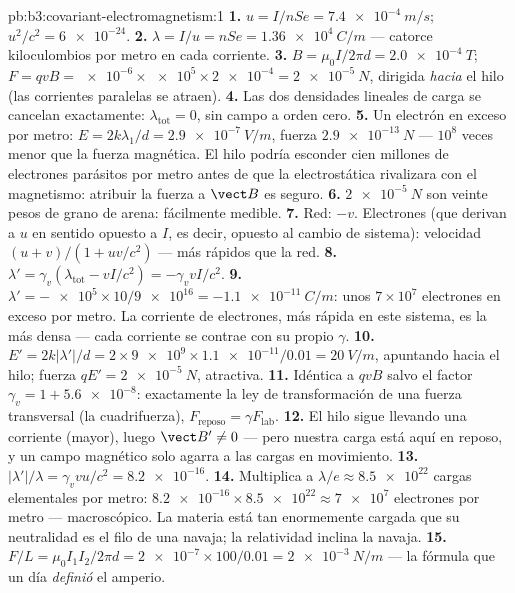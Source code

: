 \begin{solution}{pb:b3:covariant-electromagnetism:1}
\textbf{1.} $u = I/nSe = \qty{7.4e-4}{m/s}$; $u^2/c^2 =
\num{6e-24}$.
\textbf{2.} $\lambda = I/u = nSe = \qty{1.36e4}{C/m}$ --- catorce
kiloculombios por metro en cada corriente.
\textbf{3.} $B = \mu_0I/2\pi d = \qty{2.0e-4}{T}$; $F = qvB =
\num{e-6} \times \num{e5} \times \num{2e-4} = \qty{2e-5}{N}$,
dirigida \emph{hacia} el hilo (las corrientes paralelas se atraen).
\textbf{4.} Las dos densidades lineales de carga se cancelan exactamente: $\lambda_{\text{tot}}
= 0$, sin campo a orden cero.
\textbf{5.} Un electrón en exceso por metro: $E = 2k\lambda_1/d =
\qty{2.9e-7}{V/m}$, fuerza $\qty{2.9e-13}{N}$ --- $10^8$ veces menor
que la fuerza magnética. El hilo podría esconder cien millones de
electrones parásitos por metro antes de que la electrostática rivalizara con
el magnetismo: atribuir la fuerza a $\vect B$ es seguro.
\textbf{6.} $\qty{2e-5}{N}$ son veinte pesos de grano de arena: fácilmente
medible.
\textbf{7.} Red: $-v$. Electrones (que derivan a $u$ en sentido opuesto a
$I$, es decir, opuesto al cambio de sistema): velocidad
$(u + v)/(1 + uv/c^2)$ --- más rápidos que la red.
\textbf{8.} $\lambda' = \gamma_v(\lambda_{\text{tot}} - vI/c^2) =
-\gamma_v vI/c^2$.
\textbf{9.} $\lambda' = -\num{e5} \times 10/\num{9e16} =
\qty{-1.1e-11}{C/m}$: unos $7 \times 10^7$ electrones en exceso por
metro. La corriente de electrones, más rápida en este sistema, es la más
densa --- cada corriente se contrae con su propio $\gamma$.
\textbf{10.} $E' = 2k|\lambda'|/d = 2 \times \num{9e9} \times
\num{1.1e-11}/0.01 = \qty{20}{V/m}$, apuntando hacia el hilo; fuerza
$qE' = \qty{2e-5}{N}$, atractiva.
\textbf{11.} Idéntica a $qvB$ salvo el factor $\gamma_v = 1 +
\num{5.6e-8}$: exactamente la ley de transformación de una fuerza
transversal (la cuadrifuerza), $F_{\text{reposo}} = \gamma F_{\text{lab}}$.
\textbf{12.} El hilo sigue llevando una corriente (mayor), luego $\vect
B' \neq 0$ --- pero nuestra carga está aquí en reposo, y un campo magnético
solo agarra a las cargas en movimiento.
\textbf{13.} $|\lambda'|/\lambda = \gamma_v vu/c^2 = \num{8.2e-16}$.
\textbf{14.} Multiplica a $\lambda/e \approx \num{8.5e22}$
cargas elementales por metro: $\num{8.2e-16} \times \num{8.5e22}
\approx \num{7e7}$ electrones por metro --- macroscópico. La materia está
tan enormemente cargada que su neutralidad es el filo de una navaja; la
relatividad inclina la navaja.
\textbf{15.} $F/L = \mu_0I_1I_2/2\pi d = \num{2e-7} \times 100/0.01 =
\qty{2e-3}{N/m}$ --- la fórmula que un día \emph{definió} el amperio.

\end{solution}
